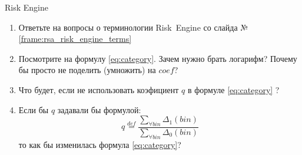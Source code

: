 \begin{frame}{Risk Engine}
	\begin{enumerate}
		\item 	Ответьте на вопросы о терминологии \mbox{Risk Engine}
		со слайда №\ref{frame:rsa_risk_engine_terms}
		\item Посмотрите на формулу \eqref{eq:category}. Зачем нужно брать логарифм?
		Почему бы просто не поделить (умножить) на $coef$?  
		\item Что будет, если не использовать коэфициент $q$ в формуле \eqref{eq:category} ?
		\item Если бы $q$ задавали бы формулой:
		\begin{equation*}
		q \stackrel{def}{=} \frac{\sum_{\forall bin} \Delta_1(bin)}{\sum_{\forall bin} \Delta_0(bin)}
		\end{equation*}
		то как бы изменилась формула \eqref{eq:category}?
	\end{enumerate}
\end{frame}



